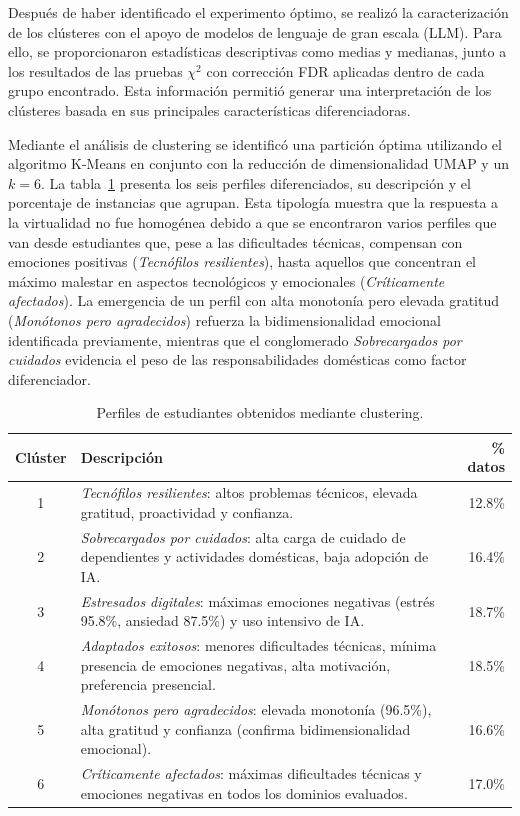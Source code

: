 \documentclass[conference]{IEEEtran}
\begin{document}
Después de haber identificado el experimento óptimo, se realizó la caracterización de los clústeres con el apoyo de modelos de lenguaje de gran escala (LLM). Para ello, se proporcionaron estadísticas descriptivas como medias y medianas, junto a los resultados de las pruebas $\chi^2$ con corrección FDR aplicadas dentro de cada grupo encontrado. Esta información permitió generar una interpretación de los clústeres basada en sus principales características diferenciadoras.

Mediante el análisis de clustering se identificó una partición óptima utilizando el algoritmo K-Means en conjunto con la reducción de dimensionalidad UMAP y un $k=6$. La tabla~\ref{tab:clusters} presenta los seis perfiles diferenciados, su descripción y el porcentaje de instancias que agrupan. Esta tipología muestra que la respuesta a la virtualidad no fue homogénea debido a que se encontraron varios perfiles que van desde estudiantes que, pese a las dificultades técnicas, compensan con emociones positivas (\textit{Tecnófilos resilientes}), hasta aquellos que concentran el máximo malestar en aspectos tecnológicos y emocionales (\textit{Críticamente afectados}). La emergencia de un perfil con alta monotonía pero elevada gratitud (\textit{Monótonos pero agradecidos}) refuerza la bidimensionalidad emocional identificada previamente, mientras que el conglomerado \textit{Sobrecargados por cuidados} evidencia el peso de las responsabilidades domésticas como factor diferenciador.

\begin{table}[htbp]
\centering
\begin{tabular}{@{}c p{} r@{}}
\toprule
\textbf{Clúster} & \textbf{Descripción} & \textbf{\% datos} \\
\midrule
1 & \textit{Tecnófilos resilientes}: altos problemas técnicos, elevada gratitud, proactividad y confianza. & 12.8\% \\
2 & \textit{Sobrecargados por cuidados}: alta carga de cuidado de dependientes y actividades domésticas, baja adopción de IA. & 16.4\% \\
3 & \textit{Estresados digitales}: máximas emociones negativas (estrés 95.8\%, ansiedad 87.5\%) y uso intensivo de IA. & 18.7\% \\
4 & \textit{Adaptados exitosos}: menores dificultades técnicas, mínima presencia de emociones negativas, alta motivación, preferencia presencial. & 18.5\% \\
5 & \textit{Monótonos pero agradecidos}: elevada monotonía (96.5\%), alta gratitud y confianza (confirma bidimensionalidad emocional). & 16.6\% \\
6 & \textit{Críticamente afectados}: máximas dificultades técnicas y emociones negativas en todos los dominios evaluados. & 17.0\% \\
\bottomrule
\end{tabular}
\caption{Perfiles de estudiantes obtenidos mediante clustering.}
\label{tab:clusters}
\end{table}
\end{document}
